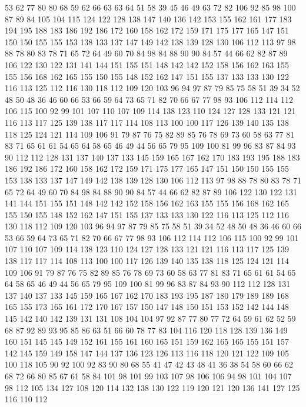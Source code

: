 53 62 77 80 80 68 59 62 66 63 63 64 51 58 39 45 46 49 63 72
82 106 92 85 98 100 87 89 84 105 104 115 124 122 128 138 147 140 136 142
153 155 162 161 177 183 194 195 188 183 186 192 186 172 160 158 162 172 159 171
175 177 165 147 151 150 150 155 155 153 138 133 137 147 149 142 138 139 128 130
106 112 113 97 98 88 78 80 83 78 71 65 72 64 49 60 70 84 98 84
88 90 90 84 57 44 66 62 82 87 89 106 122 130 122 131 141 144 151 155
151 148 142 142 152 158 156 162 163 155 155 156 168 162 165 155 150 155 148 152
162 147 151 155 137 133 133 130 122 116 113 125 112 116 130 118 112 109 120 103
96 94 97 87 79 85 75 58 51 39 34 52 48 50 48 36 46 60 66 53
66 59 64 73 65 71 82 70 66 67 77 98 93 106 112 114 112 106 115 100
92 99 101 107 110 107 109 114 138 123 110 124 127 128 133 121 121 116 113 117
125 139 138 117 117 114 108 113 100 100 117 126 139 140 135 138 118 125 124 121
114 109 106 91 79 87 76 75 82 89 85 76 78 69 73 60 58 63 77 81
83 71 65 61 61 54 65 64 58 65 46 49 44 56 65 79 95 109 100 81
99 96 83 87 84 93 90 112 112 128 131 137 140 137 133 145 159 165 167 162
170 183 193 195 188 183 186 192 186 172 160 158 162 172 159 171 175 177 165 147
151 150 150 155 155 153 138 133 137 147 149 142 138 139 128 130 106 112 113 97
98 88 78 80 83 78 71 65 72 64 49 60 70 84 98 84 88 90 90 84
57 44 66 62 82 87 89 106 122 130 122 131 141 144 151 155 151 148 142 142
152 158 156 162 163 155 155 156 168 162 165 155 150 155 148 152 162 147 151 155
137 133 133 130 122 116 113 125 112 116 130 118 112 109 120 103 96 94 97 87
79 85 75 58 51 39 34 52 48 50 48 36 46 60 66 53 66 59 64 73
65 71 82 70 66 67 77 98 93 106 112 114 112 106 115 100 92 99 101 107
110 107 109 114 138 123 110 124 127 128 133 121 121 116 113 117 125 139 138 117
117 114 108 113 100 100 117 126 139 140 135 138 118 125 124 121 114 109 106 91
79 87 76 75 82 89 85 76 78 69 73 60 58 63 77 81 83 71 65 61
61 54 65 64 58 65 46 49 44 56 65 79 95 109 100 81 99 96 83 87
84 93 90 112 112 128 131 137 140 137 133 145 159 165 167 162 170 183 193 195
187 180 179 189 189 168 165 155 173 165 161 172 170 167 157 150 147 148 150 151
153 152 142 144 148 145 142 140 142 139 131 131 108 104 104 97 92 87 77 80
77 72 64 59 61 62 52 59 68 87 92 89 93 95 85 86 63 51 66 60
78 77 83 104 116 120 118 128 139 136 149 160 151 145 145 149 152 161 155 161
160 165 151 159 162 165 165 155 151 157 142 145 159 149 158 147 144 137 136 123
126 113 116 118 120 121 122 109 105 100 118 105 90 92 100 92 83 90 80 68
55 41 47 42 43 48 41 36 38 54 58 60 66 62 68 72 66 80 85 67
61 58 84 101 98 101 99 103 107 98 106 106 94 98 101 104 107 98 112 105
134 127 108 120 114 132 138 130 122 119 120 121 120 136 141 127 125 116 110 112
